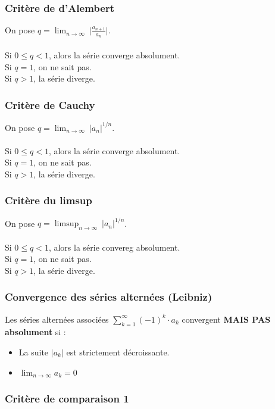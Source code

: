 \documentclass{article}
\begin{document}
\subsubsection{Critère de d'Alembert}

On pose $ q = \lim_{n\to\infty}\ \lvert \frac{a_{n+1}}{a_n} \lvert $.\\\\
Si $ 0 \leq q < 1 $, alors la série converge absolument.\\
Si $ q = 1 $, on ne sait pas.\\
Si $ q > 1 $, la série diverge.

\subsubsection{Critère de Cauchy}

On pose $ q = \lim_{n\to\infty}\ {\lvert a_{n}\lvert}^{1/n} $.\\\\
Si $ 0 \leq q < 1 $, alors la série converge absolument.\\
Si $ q = 1 $, on ne sait pas.\\
Si $ q > 1 $, la série diverge.

\subsubsection{Critère du limsup}

On pose $ q = \limsup_{n\to\infty}\ {\lvert a_{n}\lvert}^{1/n} $.\\\\
Si $ 0 \leq q < 1 $, alors la série convereg absolument.\\
Si $ q = 1 $, on ne sait pas.\\
Si $ q > 1 $, la série diverge.

\subsubsection{Convergence des séries alternées (Leibniz)}

Les séries alternées associées $ \sum_{k=1}^{\infty} (-1)^k \cdot a_k $ convergent \textbf{MAIS PAS absolument} si :
\begin{itemize}
    \item La suite $ |a_k| $ est strictement décroissante.
    \item $ \lim_{n\to\infty} a_k = 0 $
\end{itemize}

\subsubsection{Critère de comparaison 1}
\end{document}
